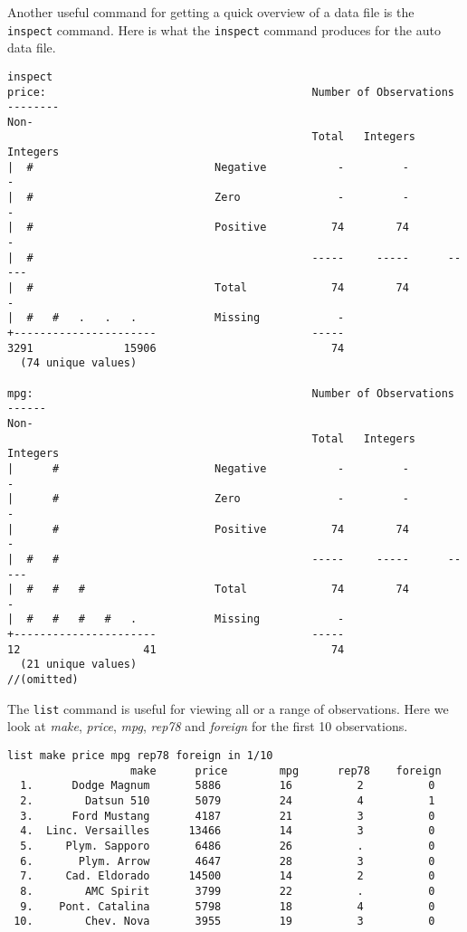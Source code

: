 Another useful command for getting a quick overview of a data file is the \lstinline{inspect} command. Here is what the \lstinline{inspect} command produces for the auto data file.
\begin{lstlisting}
inspect
price:                                         Number of Observations
--------                                                           Non-
                                               Total   Integers    Integers
|  #                            Negative           -         -          -
|  #                            Zero               -         -          -
|  #                            Positive          74        74          -
|  #                                           -----     -----      -----
|  #                            Total             74        74          -
|  #   #   .   .   .            Missing            -
+----------------------                        -----
3291              15906                           74
  (74 unique values)

mpg:                                           Number of Observations
------                                                             Non-
                                               Total   Integers    Integers
|      #                        Negative           -         -          -
|      #                        Zero               -         -          -
|      #                        Positive          74        74          -
|  #   #                                       -----     -----      -----
|  #   #   #                    Total             74        74          -
|  #   #   #   #   .            Missing            -
+----------------------                        -----
12                   41                           74
  (21 unique values)
//(omitted)
\end{lstlisting}

The \lstinline{list} command is useful for viewing all or a range of observations. Here we look at \textit{make}, \textit{price}, \textit{mpg}, \textit{rep78} and \textit{foreign} for the first 10 observations.

\begin{lstlisting}
list make price mpg rep78 foreign in 1/10
                   make      price        mpg      rep78    foreign
  1.      Dodge Magnum       5886         16          2          0
  2.        Datsun 510       5079         24          4          1
  3.      Ford Mustang       4187         21          3          0
  4.  Linc. Versailles      13466         14          3          0
  5.     Plym. Sapporo       6486         26          .          0
  6.       Plym. Arrow       4647         28          3          0
  7.     Cad. Eldorado      14500         14          2          0
  8.        AMC Spirit       3799         22          .          0
  9.    Pont. Catalina       5798         18          4          0
 10.        Chev. Nova       3955         19          3          0
\end{lstlisting}

